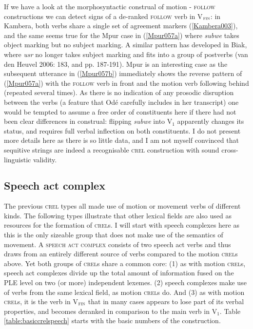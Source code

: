 If we have a look at the morphosyntactic construal of motion - \textsc{follow} constructions we can detect signs of a de-ranked \textsc{follow} verb in V$_{\textsc{fin}}$: in Kambera, both verbs share a single set of agreement markers (\ref{Kambera003}), and the same seems true for the Mpur case in (\ref{Mpur057a}) where \textit{subwe} takes object marking but no subject marking. A similar pattern has developed in Biak, where \textit{usr} no longer takes subject marking and fits into a group of postverbs (van den Heuvel 2006: 183, and pp. 187-191). Mpur is an interesting case as the subsequent utterance in (\ref{Mpur057b}) immediately shows the reverse pattern of (\ref{Mpur057a}) with the \textsc{follow} verb in front and the motion verb following behind (repeated several times). As there is no indication of any prosodic disruption between the verbs (a feature that Odé carefully includes in her transcript) one would be tempted to assume a free order of constituents here if there had not been clear differences in construal: flipping \textit{subwe} into V$_{1}$ apparently changes its status, and requires full verbal inflection on both constituents. I do not present more details here as there is so little data, and I am not myself convinced that sequitive strings are indeed a recognisable \textsc{crel} construction with sound cross-linguistic validity.

\subsection{Speech act complex} \label{sec:speechactcomplex}

The previous \textsc{crel} types all made use of motion or movement verbs of different kinds. The following types  illustrate that other lexical fields are also used as resources for the formation of \textsc{crel}s. I will start with speech complexes here as this is the only sizeable group that does not make use of the semantics of movement. A \textsc{speech act complex} consists of two speech act verbs and thus draws from an entirely different source of verbs compared to the motion \textsc{crel}s above. Yet both groups of \textsc{crel}s share a common core: (1) as with motion \textsc{crel}s, speech act complexes divide up the total amount of information fused on the PLE level on two (or more) independent lexemes. (2) speech complexes make use of verbs from the same lexical field, as motion \textsc{crel}s do. And (3) as with motion \textsc{crel}s, it is the verb in V$_{\textsc{fin}}$ that in many cases appears to lose part of its verbal properties, and becomes deranked in comparison to the main verb in V$_{1}$. Table \ref{table:basiccrelspeech} starts with the basic numbers of the construction.

